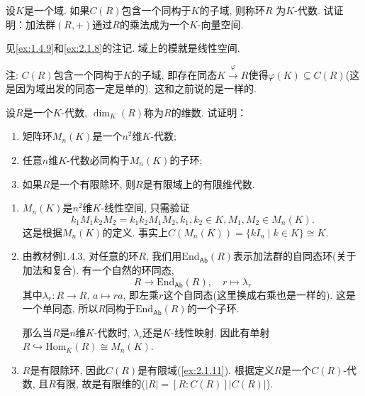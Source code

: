\begin{problem}\label{ex:2.1.12}
    设$K$是一个域. 如果$C(R)$包含一个同构于$K$的子域, 则称环$R$
为$K$-代数. 试证明：加法群$(R, +)$通过$R$的乘法成为一个$K$-向量空间.
\end{problem}

\begin{solution}
    见\ref{ex:1.4.9}和\ref{ex:2.1.8}的注记. 域上的模就是线性空间.

注: $C(R)$包含一个同构于$K$的子域, 即存在同态$K \overset{\varphi}\to R$使得$\varphi(K) \subseteq C(R)$(这是因为域出发的同态一定是单的). 这和之前说的是一样的.
\end{solution}

\begin{problem}
    设$R$是一个$K$-代数, $\dim_K(R)$称为$R$的维数.
试证明：
\begin{enumerate}[(1)]
    \item 矩阵环$M_n(K)$是一个$n^2$维$K$-代数;
    \item 任意$n$维$K$-代数必同构于$M_n(K)$的子环;
    \item 如果$R$是一个有限除环, 则$R$是有限域上的有限维代数.
\end{enumerate}
\end{problem}

\begin{solution}
    \begin{enumerate}[(1)]
        \item $M_n(K)$是$n^2$维$K$-线性空间, 只需验证
        \[
            k_1M_1k_2M_2 = k_1k_2M_1M_2, k_1, k_2 \in K, M_1, M_2 \in M_n(K).
        \]
        这是根据$M_n(K)$的定义. 事实上$C(M_n(K)) = \{kI_n \mid k \in K\} \cong K$.
        \item 由教材例1.4.3, 对任意的环$R$, 我们用$\mathrm{End}_{\mathsf{Ab}}(R)$表示加法群的自同态环(关于加法和复合). 有一个自然的环同态,
        \[
            R \to \mathrm{End}_{\mathsf{Ab}}(R),\quad r \mapsto \lambda_r
        \]
        其中$\lambda_r: R \to R,\, a \mapsto ra$, 即左乘$r$这个自同态(这里换成右乘也是一样的). 这是一个单同态, 所以$R$同构于$\mathrm{End}_{\mathsf{Ab}}(R)$的一个子环.

        那么当$R$是$n$维$K$-代数时, $\lambda_r$还是$K$-线性映射. 因此有单射$R \hookrightarrow \mathrm{Hom}_K(R) \cong M_n(K)$.
        \item $R$是有限除环, 因此$C(R)$是有限域(\ref{ex:2.1.11}). 根据定义$R$是一个$C(R)$-代数, 且$R$有限, 故是有限维的($|R| = [R:C(R)]|C(R)|$).
    \end{enumerate}
\end{solution}

